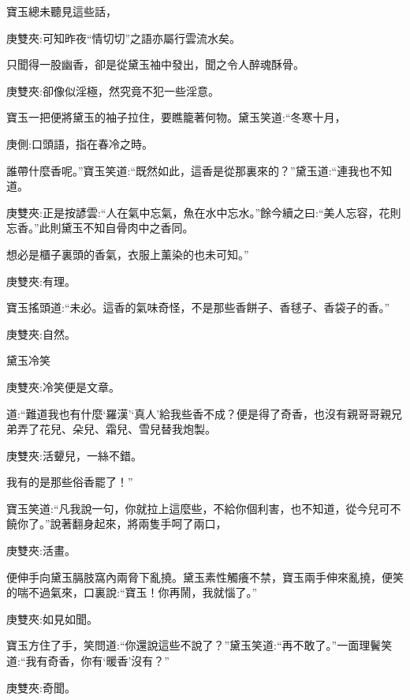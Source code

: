 \begin{parag}
    寶玉總未聽見這些話，\begin{note}庚雙夾:可知昨夜“情切切”之語亦屬行雲流水矣。\end{note}只聞得一股幽香，卻是從黛玉袖中發出，聞之令人醉魂酥骨。\begin{note}庚雙夾:卻像似淫極，然究竟不犯一些淫意。\end{note}寶玉一把便將黛玉的袖子拉住，要瞧籠著何物。黛玉笑道:“冬寒十月，\begin{note}庚側:口頭語，指在春冷之時。\end{note}誰帶什麼香呢。”寶玉笑道:“既然如此，這香是從那裏來的？”黛玉道:“連我也不知道。\begin{note}庚雙夾:正是按諺雲:“人在氣中忘氣，魚在水中忘水。”餘今續之曰:“美人忘容，花則忘香。”此則黛玉不知自骨肉中之香同。\end{note}想必是櫃子裏頭的香氣，衣服上薰染的也未可知。”\begin{note}庚雙夾:有理。\end{note}寶玉搖頭道:“未必。這香的氣味奇怪，不是那些香餅子、香毬子、香袋子的香。”\begin{note}庚雙夾:自然。\end{note}黛玉冷笑\begin{note}庚雙夾:冷笑便是文章。\end{note}道:“難道我也有什麼‘羅漢’‘真人’給我些香不成？便是得了奇香，也沒有親哥哥親兄弟弄了花兒、朵兒、霜兒、雪兒替我炮製。\begin{note}庚雙夾:活顰兒，一絲不錯。\end{note}我有的是那些俗香罷了！”
\end{parag}


\begin{parag}
    寶玉笑道:“凡我說一句，你就拉上這麼些，不給你個利害，也不知道，從今兒可不饒你了。”說著翻身起來，將兩隻手呵了兩口，\begin{note}庚雙夾:活畫。\end{note}便伸手向黛玉膈肢窩內兩脅下亂撓。黛玉素性觸癢不禁，寶玉兩手伸來亂撓，便笑的喘不過氣來，口裏說:“寶玉！你再鬧，我就惱了。”\begin{note}庚雙夾:如見如聞。\end{note}寶玉方住了手，笑問道:“你還說這些不說了？”黛玉笑道:“再不敢了。”一面理鬢笑道:“我有奇香，你有‘暖香’沒有？”\begin{note}庚雙夾:奇聞。\end{note}
\end{parag}



